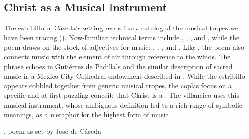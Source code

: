 
\subsection{Christ as a Musical Instrument}

The estribillo of Cáseda's setting reads like a catalog of the musical tropes
we have been tracing ().
Now-familiar technical terms include , ,
, and , while the poem draws on the stock
of adjectives for music: , ,
, and .
Like , the poem also connects music with the element of
air through reference to the winds.
The phrase  echoes  in Gutiérrez de Padilla's  and the
similar description of sacred music in a Mexico City Cathedral endowment
described in .
While the estribillo appears cobbled together from generic musical tropes, the
coplas focus on a specific and at first puzzling conceit: that Christ is a
.
The villancico uses this musical instrument, whose ambiguous definition led to
a rich range of symbolic meanings, as a metaphor for the highest form of music.


{, poem as set by José de Cáseda}

